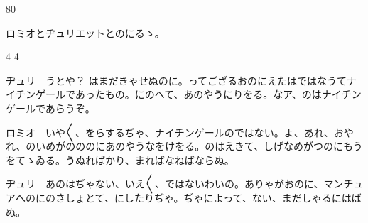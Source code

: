 \documentclass[tate,paper=b6j,jafontsize=9pt]{jlreq}
\begin{document}

\begin{azconvIndented}{8\zw}{0\zw}

ロミオとヂュリエットとのにるゝ。

\end{azconvIndented}
\begin{azconvIndented}{4\zw}{-4\zw}

ヂュリ　うとや？ はまだきゃせぬのに。ってござるおのにえたはではなうてナイチンゲールであったもの。にのへて、あのやうにりをる。なア、のはナイチンゲールであらうぞ。

ロミオ　いや{〳〵}、をらするぢゃ、ナイチンゲールのではない。よ、あれ、おやれ、のいめがのののにあのやうなをけをる。のはえきて、しげなめがつのにもうをてゝゐる。うぬればかり、まればなねばならぬ。

ヂュリ　あのはぢゃない、いえ{〳〵}、ではないわいの。ありゃがおのに、マンチュアへのにのさしょとて、にしたりぢゃ。ぢゃによって、ない、まだしゃるにはばぬ。


\end{azconvIndented}
\end{document}
